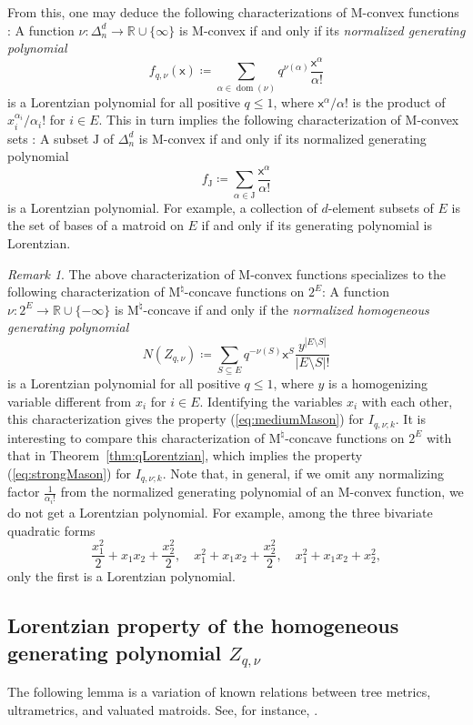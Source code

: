 \documentclass{amsart}
\theoremstyle{definition}
\theoremstyle{remark}
\newtheorem{remark}[theorem]{Remark}
\newcommand{\abs}[1]{\left|#1\right|}               %
\newcommand{\x}{\mathsf{x}}    %
\DeclareMathOperator{\dom}{{dom}}          %
\newcommand{\1}{\mathbf{1}}
\newcommand{\Mnat}{$\text{M}^\natural$}
\numberwithin{equation}{section}
\begin{document}
From this, one may deduce the following characterizations of M-convex functions \cite[Theorem 3.14]{BH20}: A function $\nu:\Delta^d_n \to \mathbb{R} \cup \{\infty\}$ is M-convex if and only if its \emph{normalized generating polynomial}
\[
f_{q,\nu}(\x) \coloneqq \sum_{\alpha \in \dom(\nu)} q^{\nu(\alpha)}\frac{\x^\alpha}{\alpha!}
\]
is a Lorentzian polynomial for all positive $q \le 1$, where 
${\x^\alpha}/{\alpha!}$ is the product of ${x_i^{\alpha_i}}/{\alpha_i!}$ for $i\in E$. 
This in turn implies the following characterization of M-convex sets \cite[Theorem 3.10]{BH20}: A subset $\mathrm{J}$ of $\Delta^d_n$ is M-convex if and only if its normalized generating polynomial
\[
f_\mathrm{J} \coloneqq \sum_{\alpha \in \mathrm{J}}\frac{\x^\alpha}{\alpha!}
\]
is a Lorentzian polynomial. For example, a collection of $d$-element subsets of $E$ is the set of bases of a matroid on $E$ if and only if its generating polynomial is Lorentzian.

\begin{remark}
The above characterization of M-convex functions  specializes to the following characterization of \Mnat-concave functions on $2^E$: A function $\nu:2^E \to \mathbb{R} \cup\{-\infty\}$ is \Mnat-concave if and only if the \emph{normalized homogeneous generating polynomial}
\[
N(Z_{q,\nu})\coloneqq \sum_{S \subseteq E} q^{-\nu(S)} \x^S \frac{y^{\abs{E \setminus S}}}{\abs{E \setminus S}!}
\]
is a Lorentzian polynomial for all positive $q \le 1$, where $y$ is a homogenizing variable different from $x_i$ for $i \in E$. 
Identifying the variables $x_i$ with each other, this characterization gives the property (\ref{eq:mediumMason}) for $I_{q,\nu;k}$.
It is interesting to compare this characterization of \Mnat-concave functions on $2^E$ with that in Theorem~\ref{thm:qLorentzian}, which implies  the property (\ref{eq:strongMason}) for $I_{q,\nu;k}$. 
Note that, in general, if we omit any normalizing factor $\frac{1}{\alpha_i!}$ from the normalized generating polynomial of an M-convex function, we do not get a Lorentzian polynomial. For example, among the three bivariate quadratic forms
\[
\frac{x_1^2}{2} +x_1x_2+\frac{x_2^2}{2}, \quad
x_1^2 +x_1x_2+\frac{x_2^2}{2}, \quad
x_1^2 +x_1x_2+x_2^2, 
\]
only the first is a Lorentzian polynomial.
\end{remark}



\subsection{Lorentzian property of the homogeneous generating polynomial $Z_{q,\nu}$}\label{sec:genpoly}
The following lemma is a variation of known relations between tree metrics, ultrametrics, and valuated matroids. See, for instance, \cite[Section 4.3]{MS15}.
\end{document}

